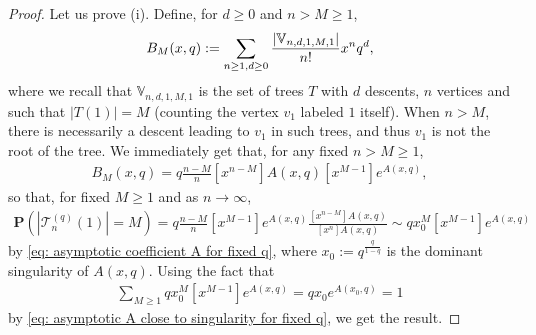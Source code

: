 \documentclass{article}
\theoremstyle{remark}
\newcommand{\abs}[1]{{\left|#1\right|}}
\newcommand{\cT}{\mathcal{T}}
\newcommand{\prob}[1]{\mathbf{P}{\left(#1\right)}}
\newcommand{\bV}{\mathbb{V}}
\begin{document}
\begin{proof}
    Let us prove (i). Define, for $d \geq 0$ and $n > M \geq 1$, 
    \begin{align*}
        B_M(x,q) := \sum_{n \geq 1, d \geq 0}\frac{
        \abs{\bV_{n,d,1,M,1}}
        }{n!} x^n q^d,
    \end{align*}
    where we recall that $\bV_{n,d,1,M,1}$ is the set of trees $T$ with $d$ descents, $n$ vertices and such that $|T(1)|=M$ (counting the vertex $v_1$ labeled $1$ itself). 
    When $n>M$, there is necessarily a descent leading to $v_1$ in such trees, and thus $v_1$ is not the root of the tree. 
    We immediately get that, for any fixed $n>M \geq 1$,
    \begin{align*}
    [x^n] B_M(x,q) = q \frac{n-M}{n} [x^{n-M}] A(x,q) [x^{M-1}] e^{A(x,q)},
    \end{align*}
    so that, for fixed $M\ge1$ and as $n\to\infty$,
    \begin{align*}
        \prob{|\cT_n^{(q)}(1)|=M} 
        = q \frac{n-M}{n} [x^{M-1}] e^{A(x,q)} \frac{[x^{n-M}]A(x,q)}{[x^n] A(x,q)}
        \sim q x_0^M [x^{M-1}] e^{A(x,q)} %
    \end{align*}
    by \eqref{eq: asymptotic coefficient A for fixed q}, where $x_0:=q^{\frac{q}{1-q}}$ is the dominant singularity of $A(x,q)$. 
    Using the fact that 
    \begin{align*}
        \sum_{M \geq 1} q x_0^M [x^{M-1}]e^{A(x,q)}=qx_0e^{A(x_0,q)}=1
    \end{align*}
    by \eqref{eq: asymptotic A close to singularity for fixed q}, we get the result.
    

\end{proof}
\end{document}
